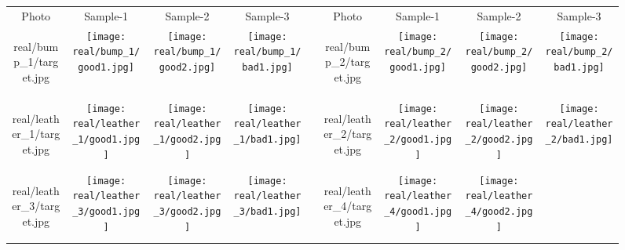 \begin{figure*}[t]
	\centering
	\addtolength{\tabcolsep}{-4.5pt}
	\begin{tabular}{ccccccccc}
		Photo & Sample-1 & Sample-2 & Sample-3 & & Photo & Sample-1 & Sample-2 & Sample-3
		\\
		\begin{overpic}[width=\resultwidth]{real/bump_1/target.jpg}
			\imglabel{Bump-3}
		\end{overpic} &
		\texttt{[image: real/bump\_1/good1.jpg]} &
		\texttt{[image: real/bump\_1/good2.jpg]} &
		\texttt{[image: real/bump\_1/bad1.jpg]} &
		&
		\begin{overpic}[width=\resultwidth]{real/bump_2/target.jpg}
			\imglabel{Bump-4}
		\end{overpic} &
		\texttt{[image: real/bump\_2/good1.jpg]} &
		\texttt{[image: real/bump\_2/good2.jpg]} &
		\texttt{[image: real/bump\_2/bad1.jpg]}
		\\
		\begin{overpic}[width=\resultwidth]{real/leather_1/target.jpg}
			\imglabel{Leather-3}
		\end{overpic} &
		\texttt{[image: real/leather\_1/good1.jpg]} &
		\texttt{[image: real/leather\_1/good2.jpg]} &
		\texttt{[image: real/leather\_1/bad1.jpg]} &
		&
		\begin{overpic}[width=\resultwidth]{real/leather_2/target.jpg}
			\imglabel{Leather-4}
		\end{overpic} &
		\texttt{[image: real/leather\_2/good1.jpg]} &
		\texttt{[image: real/leather\_2/good2.jpg]} &
		\texttt{[image: real/leather\_2/bad1.jpg]}
		\\
		\begin{overpic}[width=\resultwidth]{real/leather_3/target.jpg}
			\imglabel{Leather-5}
		\end{overpic} &
		\texttt{[image: real/leather\_3/good1.jpg]} &
		\texttt{[image: real/leather\_3/good2.jpg]} &
		\texttt{[image: real/leather\_3/bad1.jpg]} &
		&
		\begin{overpic}[width=\resultwidth]{real/leather_4/target.jpg}
			\imglabel{Leather-6}
		\end{overpic} &
		\texttt{[image: real/leather\_4/good1.jpg]} &
		\texttt{[image: real/leather\_4/good2.jpg]} &

\end{tabular}
\end{figure*}
